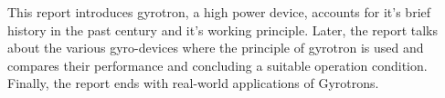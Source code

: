 This report introduces gyrotron, a high power device, accounts for it's brief history in the past century and it's working principle. Later, the report talks about the various gyro-devices where the principle of gyrotron is used and compares their performance and concluding a suitable operation condition. Finally, the report ends with real-world applications of Gyrotrons.